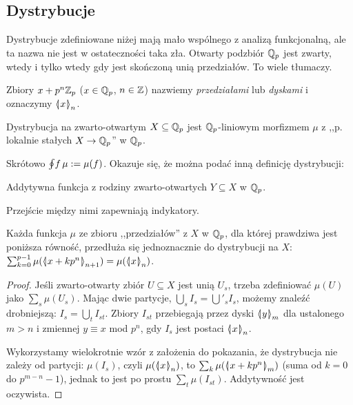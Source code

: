\subsection{Dystrybucje} 
Dystrybucje  zdefiniowane niżej mają mało wspólnego z analizą funkcjonalną, ale ta nazwa nie jest w ostateczności taka zła.
Otwarty podzbiór $\mathbb Q_p$ jest zwarty, wtedy i tylko wtedy gdy jest skończoną unią przedziałów. 
To wiele tłumaczy.

Zbiory $x+p^n \mathbb Z_p$ ($x \in \mathbb Q_p$, $n \in \mathbb Z$) nazwiemy \emph{przedziałami} lub \emph{dyskami} i oznaczymy $\mathrel{\langle\mkern-3.85mu\mid\mkern-4mu} {x}\mathrel{\mkern-4mu\mid\mkern-3.85mu\rangle}_{n}$.

\begin{definicja}
	Dystrybucja na zwarto-otwartym $X \subseteq \mathbb Q_p$ jest $\mathbb Q_p$-liniowym morfizmem $\mu$ z ,,p. lokalnie stałych $X \to \mathbb Q_p$'' w $\mathbb Q_p$.
\end{definicja}

Skrótowo $\oint \!f\, \mu := \mu(f)$.
Okazuje się, że można podać inną definicję dystrybucji:

\begin{definicja}
	Addytywna funkcja z rodziny zwarto-otwartych $Y \subseteq X$ w $\mathbb Q_p$.
\end{definicja}

Przejście między nimi zapewniają indykatory.

\begin{fakt} \label{sonrisa}
	Każda funkcja $\mu$ ze zbioru ,,przedziałów'' z $X$ w $\mathbb Q_p$, dla której prawdziwa jest poniższa równość, przedłuża się jednoznacznie do dystrybucji na $X$: $\sum_{k = 0}^{p-1} \mu (\mathrel{\langle\mkern-3.85mu\mid\mkern-4mu} {x + kp^n}\mathrel{\mkern-4mu\mid\mkern-3.85mu\rangle}_{n+1}) = \mu(\mathrel{\langle\mkern-3.85mu\mid\mkern-4mu} {x}\mathrel{\mkern-4mu\mid\mkern-3.85mu\rangle}_{n})$.
\end{fakt}

\begin{proof}
	Jeśli zwarto-otwarty zbiór $U \subseteq X$ jest unią $U_s$, trzeba zdefiniować $\mu(U)$ jako $\sum_s \mu(U_s)$.
	Mając dwie partycje, $\bigcup_s I_s = \bigcup'_s I_s$, możemy znaleźć drobniejszą: $I_s = \bigcup_t I_{st}$.
	Zbiory $I_{st}$ przebiegają przez dyski $\mathrel{\langle\mkern-3.85mu\mid\mkern-4mu} {y}\mathrel{\mkern-4mu\mid\mkern-3.85mu\rangle}_{m}$ dla ustalonego $m > n$ i zmiennej $y \equiv x$ mod $p^n$, gdy $I_s$ jest postaci $\mathrel{\langle\mkern-3.85mu\mid\mkern-4mu} {x}\mathrel{\mkern-4mu\mid\mkern-3.85mu\rangle}_{n}$.

	Wykorzystamy wielokrotnie wzór z założenia do pokazania, że dystrybucja nie zależy od partycji: $\mu(I_s)$, czyli $\mu(\mathrel{\langle\mkern-3.85mu\mid\mkern-4mu} {x}\mathrel{\mkern-4mu\mid\mkern-3.85mu\rangle}_{n})$, to $\sum_k \mu(\mathrel{\langle\mkern-3.85mu\mid\mkern-4mu} {x + kp^n}\mathrel{\mkern-4mu\mid\mkern-3.85mu\rangle}_{m})$ (suma od $k = 0$ do $p^{m-n}-1$), jednak to jest po prostu $\sum_t \mu(I_{st})$.
	Addytywność jest oczywista.
\end{proof}

